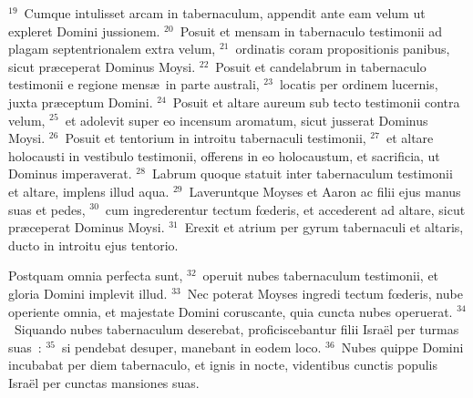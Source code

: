 ${}^{19}$~Cumque intulisset arcam in tabernaculum, appendit ante eam velum ut expleret Domini jussionem.
${}^{20}$~Posuit et mensam in tabernaculo testimonii ad plagam septentrionalem extra velum,
${}^{21}$~ordinatis coram propositionis panibus, sicut pr\ae ceperat Dominus Moysi.
${}^{22}$~Posuit et candelabrum in tabernaculo testimonii e regione mens\ae\ in parte australi,
${}^{23}$~locatis per ordinem lucernis, juxta pr\ae ceptum Domini.
${}^{24}$~Posuit et altare aureum sub tecto testimonii contra velum,
${}^{25}$~et adolevit super eo incensum aromatum, sicut jusserat Dominus Moysi.
${}^{26}$~Posuit et tentorium in introitu tabernaculi testimonii,
${}^{27}$~et altare holocausti in vestibulo testimonii, offerens in eo holocaustum, et sacrificia, ut Dominus imperaverat.
${}^{28}$~Labrum quoque statuit inter tabernaculum testimonii et altare, implens illud aqua.
${}^{29}$~Laveruntque Moyses et Aaron ac filii ejus manus suas et pedes,
${}^{30}$~cum ingrederentur tectum fœderis, et accederent ad altare, sicut pr\ae ceperat Dominus Moysi.
${}^{31}$~Erexit et atrium per gyrum tabernaculi et altaris, ducto in introitu ejus tentorio.

 Postquam omnia perfecta sunt,
${}^{32}$~operuit nubes tabernaculum testimonii, et gloria Domini implevit illud.
${}^{33}$~Nec poterat Moyses ingredi tectum fœderis, nube operiente omnia, et majestate Domini coruscante, quia cuncta nubes operuerat.
${}^{34}$~Siquando nubes tabernaculum deserebat, proficiscebantur filii Isra\"el per turmas suas~:
${}^{35}$~si pendebat desuper, manebant in eodem loco.
${}^{36}$~Nubes quippe Domini incubabat per diem tabernaculo, et ignis in nocte, videntibus cunctis populis Isra\"el per cunctas mansiones suas.
